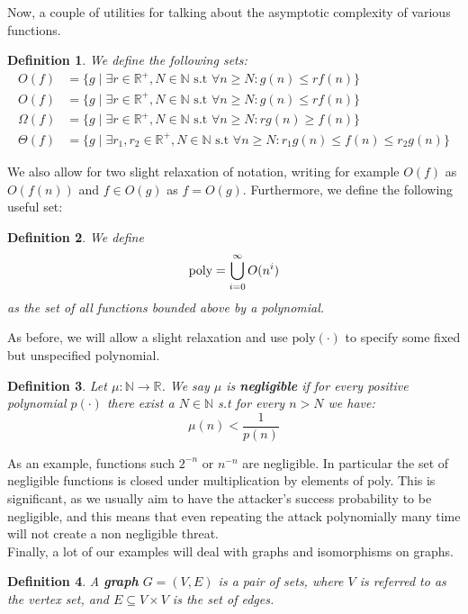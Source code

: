 \documentclass{article}
\newtheorem{definition}{Definition}
\begin{document}
Now, a couple of utilities for talking about the asymptotic complexity of various functions.

\begin{definition} We define the following sets:
\begin{align*}
    O(f) &= \{ g \mid \exists r \in \mathbb{R}^+, N \in \mathbb{N} \text{ s.t } \forall n \geq N : g(n) \leq r f(n)  \} \\
    O(f) &= \{ g \mid \exists r \in \mathbb{R}^+, N \in \mathbb{N} \text{ s.t } \forall n \geq N : g(n) \leq r f(n)  \} \\
    \Omega(f) &= \{ g \mid \exists r \in \mathbb{R}^+, N \in \mathbb{N} \text{ s.t } \forall n \geq N : r g(n) \geq f(n)  \} \\
    \Theta(f) &= \{ g \mid \exists r_1,r_2 \in \mathbb{R}^+, N \in \mathbb{N} \text{ s.t } \forall n \geq N : r_1 g(n) \leq f(n) \leq r_2 g(n)  \}
\end{align*}
\end{definition}
We also allow for two slight relaxation of notation, writing for example $O(f)$ as $O(f(n))$ and $f \in O(g)$ as $f = O(g)$. Furthermore, we define the following useful set:
\begin{definition} We define
\[\text{\normalfont{poly}} = \bigcup_{i = 0}^\infty O(n^i)\]
as the set of all functions bounded above by a polynomial. 
\end{definition}
As before, we will allow a slight relaxation and use $\text{poly}(\cdot)$ to specify some fixed but unspecified polynomial. \\

\begin{definition}
Let $\mu : \mathbb{N} \to \mathbb{R}$. We say $\mu$ is \textbf{negligible} if for every positive polynomial $p(\cdot)$ there exist a $N \in \mathbb{N}$ s.t for every $n > N$ we have:
\[\mu(n) < \frac{1}{p(n)}\]
\end{definition}
As an example, functions such $2^{-n}$ or $n^{-n}$ are negligible. In particular the set of negligible functions is closed under multiplication by elements of poly. This is significant, as we usually aim to have the attacker's success probability to be negligible, and this means that even repeating the attack polynomially many time will not create a non negligible threat. \\

Finally, a lot of our examples will deal with graphs and isomorphisms on graphs.

\begin{definition}
A \textbf{graph} $G = (V, E)$ is a pair of sets, where $V$ is referred to as the vertex set, and $E \subseteq V \times V$ is the set of edges.  
\end{definition}
\end{document}
